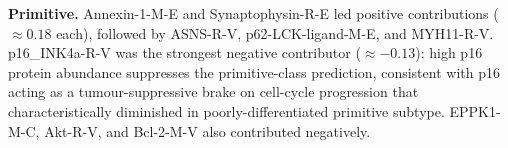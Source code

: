 \textbf{Primitive.} Annexin-1-M-E and Synaptophysin-R-E led positive contributions ($\approx 0.18$ each), followed by ASNS-R-V, p62-LCK-ligand-M-E, and MYH11-R-V. p16\_INK4a-R-V was the strongest negative contributor ($\approx-0.13$): high p16 protein abundance suppresses the primitive-class prediction, consistent with p16 acting as a tumour-suppressive brake on cell-cycle progression that characteristically diminished in poorly-differentiated primitive subtype. EPPK1-M-C, Akt-R-V, and Bcl-2-M-V also contributed negatively.



